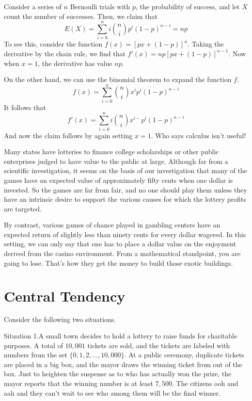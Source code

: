 \begin{example}
Consider a series of $n$ Bernoulli trials with $p$, the probability
of success, and let $X$ count the number of successes.  Then, we claim
that
\[
E(X)=\sum_{i=0}^n i\binom{n}{i}p^i(1-p)^{n-i}=np
\]
To see this, consider the function $f(x)=[px+(1-p)]^n$. Taking the
derivative by the chain rule, we find that $f'(x)=np[px+(1-p)]^{n-1}$.
Now when $x=1$,  the derivative has value $np$.

On the other hand, we can use the binomial theorem to expand the function $f$.
\[
f(x)=\sum_{i=0}^n \binom{n}{i}x^ip^i(1-p)^{n-i}
\]
It follows that
\[
f'(x)=\sum_{i=0}^n i \binom{n}{i}x^{i-}p^i(1-p)^{n-i}
\]
And now the claim follows by again setting $x=1$.  Who says calculus isn't
useful!
\end{example}

\begin{example}
Many states have lotteries to finance college scholarships
or other public enterprises judged to have value to the public
at large.  Although far from a scientific investigation, it seems on
the basis of our investigation that many of the games have an 
expected value of approximately fifty cents when one
dollar is invested.  So the games are far from fair, and no
one should play them unless they have an intrinsic desire
to support the various causes for which the lottery profits
are targeted.

By contrast, various games of chance played in gambling
centers have an expected return of slightly less than ninety
cents for every dollar wagered.  In this setting, we can
only say that one has to place a dollar value on the 
enjoyment derived from the casino environment.  From a mathematical
standpoint, you are going to lose.  That's how they get the money
to build those exotic buildings.
\end{example}

\section{Central Tendency}

Consider the following two situations.

Situation 1.\quad A small town decides to hold a lottery to raise funds for
charitable purposes.  A total of $10,001$ tickets are sold, and the
tickets are labeled with numbers from the set $\{0,1,2,\dots,10,000\}$. 
At a public ceremony, duplicate tickets are placed in a big box, and
the mayor draws the winning ticket from out of the box.  Just to heighten 
the suspense as to who has actually won the prize, the mayor reports that 
the winning number is at least $7,500$.  The citizens ooh and aah and they
can't wait to see who among them will be the final winner.

